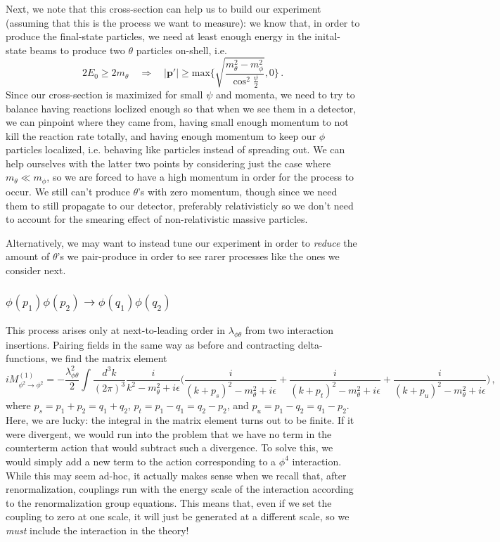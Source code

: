 \documentclass{article}
\numberwithin{equation}{subsection}
\begin{document}
Next, we note that this cross-section can help us to build our experiment (assuming that this is the process we want to measure): we know that, in order to produce the final-state particles,
we need at least enough energy in the inital-state beams to produce two $\theta$ particles on-shell, i.e.
\begin{equation}
	2E_0 \ge 2m_\theta\quad \Rightarrow \quad |\mathbf{p}'| \ge \text{max}\Big\{\sqrt{\frac{m_\theta^2 - m_\phi^2}{\cos^2\frac{\psi}{2}}}, 0\Big\}\,.
\end{equation}
Since our cross-section is maximized for small $\psi$ and momenta, we need to try to balance having reactions loclized enough so that when we see them in a detector, 
we can pinpoint where they came from, having small enough momentum to not kill the reaction rate totally, and having enough momentum to keep our $\phi$
particles localized, i.e. behaving like particles instead of spreading out. We can help ourselves with the latter two points by considering just the case
where $m_\theta \ll m_\phi$, so we are forced to have a high momentum in order for the process to occur. We still can't produce $\theta$'s with zero
momentum, though since we need them to still propagate to our detector, preferably relativisticly so we don't need to account for the smearing effect
of non-relativistic massive particles.

Alternatively, we may want to instead tune our experiment in order to \textit{reduce} the amount of $\theta$'s we pair-produce in order to
see rarer processes like the ones we consider next.

\subsubsection{$\phi(p_1)\phi(p_2)\to\phi(q_1)\phi(q_2)$}

This process arises only at next-to-leading order in $\lambda_{\phi\theta}$ from two interaction insertions. Pairing fields in the same way as before
and contracting delta-functions, we find the matrix element
\begin{equation}
	iM^{(1)}_{\phi^2\to\phi^2} = -\frac{\lambda_{\phi\theta}^2}{2}\int\frac{d^3k}{(2\pi)^3}\frac{i}{k^2 - m_\theta^2 + i\epsilon}
		\Big(\frac{i}{(k + p_s)^2 - m_\theta^2 + i\epsilon} + \frac{i}{(k + p_t)^2 - m_\theta^2 + i\epsilon} + \frac{i}{(k + p_u)^2 - m_\theta^2 + i\epsilon}\Big)\,,
\end{equation}
where $p_s = p_1 + p_2 = q_1 + q_2$, $p_t = p_1 - q_1 = q_2 - p_2$, and $p_u = p_1 - q_2 = q_1 - p_2$. Here, we are lucky: the integral in the matrix element
turns out to be finite. If it were divergent, we would run into the problem that we have no term in the counterterm action that would subtract such a divergence.
To solve this, we would simply add a new term to the action corresponding to a $\phi^4$ interaction. While this may seem ad-hoc, it actually makes sense when we
recall that, after renormalization, couplings run with the energy scale of the interaction according to the renormalization group equations. This means that, even
if we set the coupling to zero at one scale, it will just be generated at a different scale, so we \textit{must} include the interaction in the theory!
\end{document}
